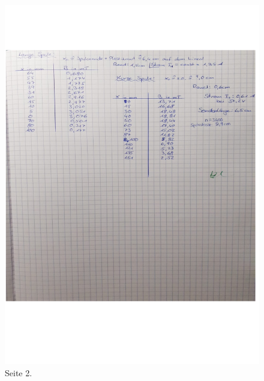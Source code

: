 \begin{figure}
    \centering
    \includegraphics[width=\textwidth]{data1.pdf}
    \caption{Seite 2.}
    \label{fig:data2}
\end{figure}